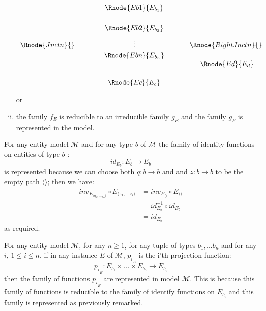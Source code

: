 \documentclass[10pt,a4paper]{article}
\newcommand{\genericmodel}{\mathcal{M}}
\begin{document}
\begin{definition}
\begin{enumerate}[(i)]
{\begin{center}
$
\begin{array}{cp{0.75cm}cp{0.55cm}c}
               &&\Rnode{Eb1}{E_{b_1}}   &&                      \\ [0.6cm]
               &&\Rnode{Eb2}{E_{b_2}}   &&                      \\ [0.2cm]
\Rnode{Jnctn}{}&&  \vdots               &&\Rnode{RightJnctn}{}  \\ [0.1cm]							
               &&\Rnode{Ebn}{E_{b_n}}   &&                      \\ [0cm]
							 &&                       &&\mbox{ }\Rnode{Ed}{E_d}       \\ [0.5cm]
               &&\Rnode{Ec}{{E_c}}      &&                      \\
\end{array}
$
\end{center}
} 
\noindent or
\item{
the family $f_E$ is reducible to an irreducible family $g_E$ and the family $g_E$ is represented in the model. 
}
\end{enumerate}
\end{definition}



\begin{remark}
For any entity model $\genericmodel$ and for any type $b$ of $\genericmodel$ the family of identity functions on 
entities of type $b$ :
$$
id_{E_b} : E_b \rightarrow E_b
$$
is represented because we can choose both $q: b \rightarrow b$ and and
$z: b \rightarrow b$ to be the empty path $\langle \rangle$; then we have:
\begin{align*}
inv_{E_{\langle q_1,...q_n\rangle}}\circ E_{\langle z_1,...z_l \rangle} & = inv_{E_{\langle \rangle}} \circ E_{\langle \rangle} \\
                                                                        & = id_{E_b}^{-1} \circ id_{E_b} \\
                                                                        & = id_{E_b} 
\end{align*}
as required.
\end{remark}
\begin{remark}
For any entity model $\genericmodel$, for any $n \geq 1$, for any tuple of types $b_1,...b_n$ and for any $i$, $1 \leq i \leq n$, if in any instance
$E$ of $\genericmodel$, ${p_i}_{_E}$ is the i'th projection function:
$$
{p_i}_{_E}: E_{b_1} \times ... \times E_{b_n} \rightarrow E_{b_i}
$$
then the family of functions ${p_i}_{_E}$ are represented in model $\genericmodel$. This is because this family of functions is reducible to the family of identify functions on $E_{b_i}$ and this family is represented as previously remarked.
\end{remark}
\end{document}
